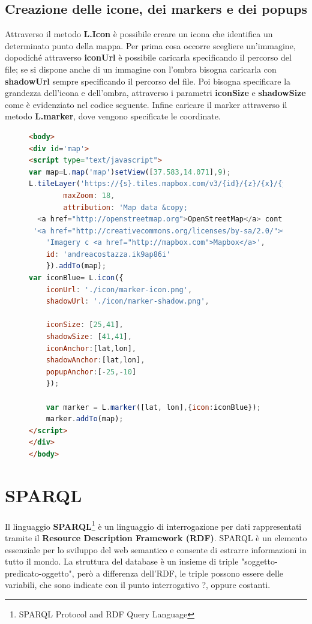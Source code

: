 \documentclass[a4paper,11pt]{article}
\begin{document}
\subsection{Creazione delle icone, dei markers e dei popups}
\label{sec:3.2}
Attraverso il metodo \textbf{L.Icon} è possibile creare un icona che identifica un determinato punto della mappa. Per prima cosa occorre scegliere un'immagine, dopodiché attraverso \textbf{iconUrl} è possibile caricarla specificando il percorso del file; se si dispone anche di un immagine con l'ombra bisogna caricarla con \textbf{shadowUrl} sempre specificando il percorso del file. Poi bisogna specificare la grandezza dell'icona e dell'ombra, attraverso i parametri \textbf{iconSize} e \textbf{shadowSize} come è evidenziato nel codice seguente. Infine caricare il marker attraverso il metodo \textbf{L.marker}, dove vengono specificate le coordinate.
\begin{figure}[htb]
\begin{lstlisting}[language=HTML, basicstyle=\large]
<body>		
<div id='map'>
<script type="text/javascript">
var map=L.map('map')setView([37.583,14.071],9);
L.tileLayer('https://{s}.tiles.mapbox.com/v3/{id}/{z}/{x}/{y}.png',{
        maxZoom: 18,
        attribution: 'Map data &copy; 
  <a href="http://openstreetmap.org">OpenStreetMap</a> contributors,'+
 '<a href="http://creativecommons.org/licenses/by-sa/2.0/">CC-BY-SA</a>,'+
	'Imagery c <a href="http://mapbox.com">Mapbox</a>',
	id: 'andreacostazza.ik9ap86i'
	}).addTo(map);
var iconBlue= L.icon({
	iconUrl: './icon/marker-icon.png',
	shadowUrl: './icon/marker-shadow.png',
			
	iconSize: [25,41],
	shadowSize: [41,41],
	iconAnchor:[lat,lon],
	shadowAnchor:[lat,lon],
	popupAnchor:[-25,-10]
	});
	
	var marker = L.marker([lat, lon],{icon:iconBlue});		
	marker.addTo(map);
</script>
</div>
</body>
\end{lstlisting}
\end{figure}
\newpage
\section{SPARQL}
\label{sec:4}
Il linguaggio \textbf{SPARQL}\footnote{SPARQL Protocol and RDF Query Language} è un linguaggio di interrogazione per dati rappresentati tramite il \textbf{Resource Description Framework (RDF)}.
SPARQL è un elemento essenziale per lo sviluppo del web semantico e consente di estrarre informazioni in tutto il mondo.\newline 
La struttura del database è un insieme di triple "soggetto-predicato-oggetto", però a differenza dell'RDF, le triple possono essere delle variabili, che sono indicate con il punto interrogativo ?, oppure costanti.
\end{document}
